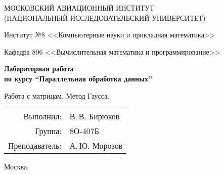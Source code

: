 \begin{titlepage}
\begin{center}
\large
МОСКОВСКИЙ АВИАЦИОННЫЙ ИНСТИТУТ\\ (НАЦИОНАЛЬНЫЙ ИССЛЕДОВАТЕЛЬСКИЙ УНИВЕРСИТЕТ)

\vspace{20pt}

Институт №8 <<Компьютерные науки и прикладная математика>>

Кафедра 806 <<Вычислительная математика и программирование>>
\end{center}

\vspace{60pt}

\begin{center}
\bfseries
\large
Лабораторная работа  \\по курсу \enquote{Параллельная обработка данных}

\vspace{54pt}

Работа с матрицам. Метод Гаусса.
\end{center}

\vfill

\begin{flushright}
\large
\begin{tabular}{rl}
Выполнил: & В.\,В. Бирюков \\
Группа: & 8О-407Б \\
Преподаватель: & А.\,Ю. Морозов \\
\end{tabular}
\end{flushright}

\vspace{92pt}

\begin{center}
\large
Москва, \the\year
\end{center}
\end{titlepage}

\pagebreak
